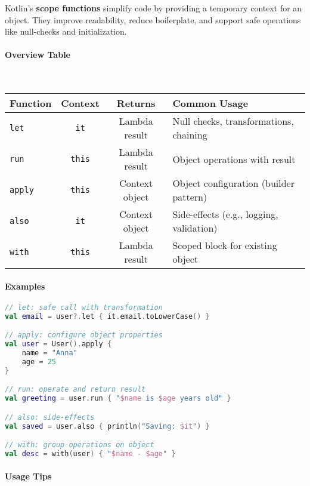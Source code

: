 \documentclass[a4paper,12pt]{article}
\begin{document}
Kotlin's \textbf{scope functions} simplify code by providing a temporary context for an object. They improve readability, reduce boilerplate, and support safe operations like null-checks and initialization.

\paragraph{Overview Table}\mbox{}\\

\begin{tabular}{|l|c|c|p{6cm}|}
\hline
\textbf{Function} & \textbf{Context} & \textbf{Returns} & \textbf{Common Usage} \\
\hline
\texttt{let}   & \texttt{it}   & Lambda result     & Null checks, transformations, chaining \\
\texttt{run}   & \texttt{this} & Lambda result     & Object operations with result \\
\texttt{apply} & \texttt{this} & Context object    & Object configuration (builder pattern) \\
\texttt{also}  & \texttt{it}   & Context object    & Side-effects (e.g., logging, validation) \\
\texttt{with}  & \texttt{this} & Lambda result     & Scoped block for existing object \\
\hline
\end{tabular}

\paragraph{Examples}

\begin{lstlisting}[language=Kotlin]
// let: safe call with transformation
val email = user?.let { it.email.toLowerCase() }

// apply: configure object properties
val user = User().apply {
    name = "Anna"
    age = 25
}

// run: operate and return result
val greeting = user.run { "$name is $age years old" }

// also: side-effects
val saved = user.also { println("Saving: $it") }

// with: group operations on object
val desc = with(user) { "$name - $age" }
\end{lstlisting}

\paragraph{Usage Tips}
\end{document}
